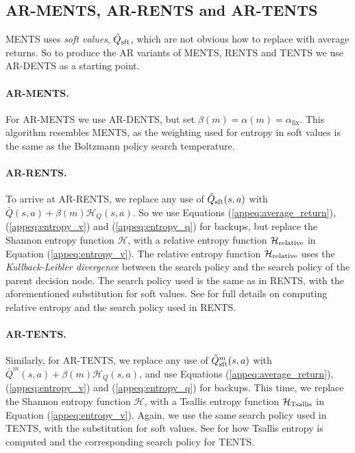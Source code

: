 \documentclass{article}
\newcommand{\cl}[1]{\mathcal{#1}}
\theoremstyle{plain}
\begin{document}
\begin{appendices}
    \subsection{AR-MENTS, AR-RENTS and AR-TENTS}
        MENTS uses \textit{soft values}, $\hat{Q}_{\textnormal{sft}}$, which are not obvious how to replace with average returns. So to produce the AR variants of MENTS, RENTS and TENTS we use AR-DENTS as a starting point.

        \paragraph{AR-MENTS.} For AR-MENTS we use AR-DENTS, but set $\beta(m)=\alpha(m)=\alpha_{\text{fix}}$. This algorithm resembles MENTS, as the weighting used for entropy in soft values is the same as the Boltzmann policy search temperature.

        \paragraph{AR-RENTS.} To arrive at AR-RENTS, we replace any use of $\hat{Q}_{\textnormal{sft}}(s,a)$ with $\bar{Q}(s,a)+\beta(m)\cl{H}_Q(s,a)$. So we use Equations (\ref{appeq:average_return}), (\ref{appeq:entropy_v}) and (\ref{appeq:entropy_q}) for backups, but replace the Shannon entropy function $\cl{H}$, with a relative entropy function $\cl{H}_{\textnormal{relative}}$ in Equation (\ref{appeq:entropy_v}). The relative entropy function $\cl{H}_{\textnormal{relative}}$ uses the \textit{Kullback-Leibler divergence} between the search policy and the search policy of the parent decision node. The search policy used is the same as in RENTS, with the aforementioned substitution for soft values. See \cite{rents_your_tents} for full details on computing relative entropy and the search policy used in RENTS.

        \paragraph{AR-TENTS.} Similarly, for AR-TENTS, we replace any use of $\hat{Q}^m_{\textnormal{sft}}(s,a)$ with $\bar{Q}^m(s,a)+\beta(m)\cl{H}_Q(s,a)$, and use Equations (\ref{appeq:average_return}), (\ref{appeq:entropy_v}) and (\ref{appeq:entropy_q}) for backups. This time, we replace the Shannon entropy function $\cl{H}$, with a Tsallis entropy function $\cl{H}_{\textnormal{Tsallis}}$ in Equation (\ref{appeq:entropy_v}). Again, we use the same search policy used in TENTS, with the substitution for soft values. See \cite{rents_your_tents} for how Tsallis entropy is computed and the corresponding search policy for TENTS.
        

\end{appendices}
\end{document}
